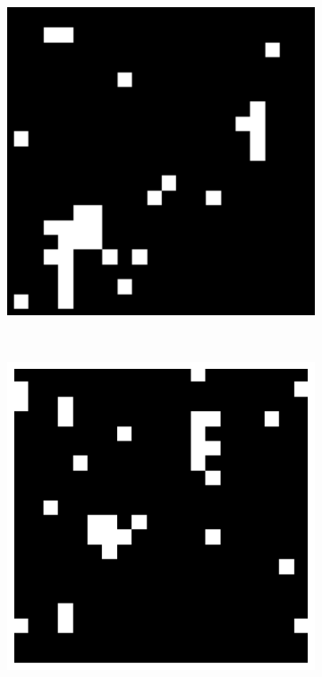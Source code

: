 \documentclass[11pt, a4paper]{report} %
\begin{document}
\begin{figure}[htb]
	\centering
	\begin{subfigure}[c]{0.2\linewidth}
		\includegraphics[width=\linewidth]{20_by_20_Lattice_step5000_T=22.pdf}
	\end{subfigure}
	~
	\begin{subfigure}[c]{0.2\linewidth}
		\includegraphics[width=\linewidth]{20_by_20_Lattice_step5000_T=23.pdf}

\end{subfigure}
\end{figure}
\end{document}
